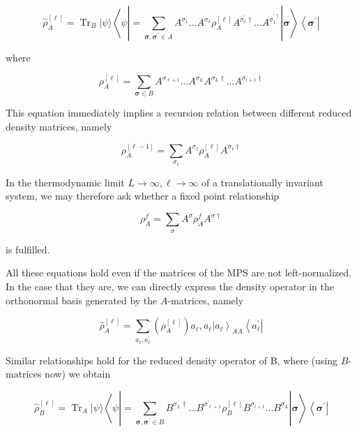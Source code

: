 \documentclass[12pt]{article}
\begin{document}
\begin{equation*}
\hat{\rho}_{A}^{[\ell]}=\operatorname{Tr}_{B}|\psi\rangle\left\langle\psi\left|=\sum_{\boldsymbol{\sigma}, \boldsymbol{\sigma}^{\prime} \in A} A^{\sigma_{1}} \ldots A^{\sigma_{\ell}} \rho_{A}^{[\ell]} A^{\sigma_{\ell}^{\prime} \dagger} \ldots A^{\sigma_{1}^{\prime \dagger}}\right| \boldsymbol{\sigma}\right\rangle\left\langle\boldsymbol{\sigma}^{\prime}\right| \tag{119}
\end{equation*}


where


\begin{equation*}
\rho_{A}^{[\ell]}=\sum_{\boldsymbol{\sigma} \in B} A^{\sigma_{\ell+1}} \ldots A^{\sigma_{L}} A^{\sigma_{L} \dagger} \ldots A^{\sigma_{t+1} \dagger} \tag{120}
\end{equation*}


This equation immediately implies a recursion relation between different reduced density matrices, namely


\begin{equation*}
\rho_{A}^{[\ell-1]}=\sum_{\sigma_{\ell}} A^{\sigma_{\ell}} \rho_{A}^{[\ell]} A^{\sigma_{\ell} \dagger} \tag{121}
\end{equation*}


In the thermodynamic limit $L \rightarrow \infty, \ell \rightarrow \infty$ of a translationally invariant system, we may therefore ask whether a fixed point relationship


\begin{equation*}
\rho_{A}^{f}=\sum_{\sigma} A^{\sigma} \rho_{A}^{f} A^{\sigma \dagger} \tag{122}
\end{equation*}


is fulfilled.

All these equations hold even if the matrices of the MPS are not left-normalized. In the case that they are, we can directly express the density operator in the orthonormal basis generated by the $A$-matrices, namely


\begin{equation*}
\hat{\rho}_{A}^{[\ell]}=\sum_{a_{\ell}, a_{\ell}^{\prime}}\left(\rho_{A}^{[\ell]}\right) a_{\ell}, a_{\ell}\left|a_{\ell}\right\rangle_{A A}\left\langle a_{\ell}^{\prime}\right| \tag{123}
\end{equation*}


Similar relationships hold for the reduced density operator of B, where (using $B$-matrices now) we obtain


\begin{equation*}
\hat{\rho}_{B}^{[\ell]}=\operatorname{Tr}_{A}|\psi\rangle\left\langle\psi\left|=\sum_{\boldsymbol{\sigma}, \boldsymbol{\sigma}^{\prime} \in B} B^{\sigma_{L}^{\prime} \dagger} \ldots B^{\sigma_{\ell+1}^{\prime}} \rho_{B}^{[\ell]} B^{\sigma_{l+1}} \ldots B^{\sigma_{L}}\right| \boldsymbol{\sigma}\right\rangle\left\langle\boldsymbol{\sigma}^{\prime}\right| \tag{124}
\end{equation*}
\end{document}
